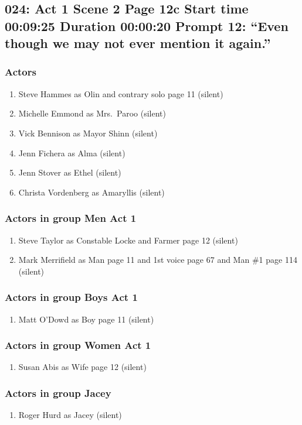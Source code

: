 \subsection{024: Act 1 Scene 2 Page 12c Start time 00:09:25 Duration 00:00:20 Prompt 12: ``Even though we may not ever mention it again.''}

\subsubsection{Actors}
\begin{enumerate}
\item Steve Hammes as Olin and contrary solo page 11 (silent)
\item Michelle Emmond as Mrs.~Paroo (silent)
\item Vick Bennison as Mayor Shinn (silent)
\item Jenn Fichera as Alma (silent)
\item Jenn Stover as Ethel (silent)
\item Christa Vordenberg as Amaryllis (silent)
\end{enumerate}
\subsubsection{Actors in group Men Act 1}
\begin{enumerate}
\item Steve Taylor as Constable Locke and Farmer page 12 (silent)
\item Mark Merrifield as Man page 11 and 1st voice page 67 and Man \#1 page 114 (silent)
\end{enumerate}
\subsubsection{Actors in group Boys Act 1}
\begin{enumerate}
\item Matt O'Dowd as Boy page 11 (silent)
\end{enumerate}
\subsubsection{Actors in group Women Act 1}
\begin{enumerate}
\item Susan Abis as Wife page 12 (silent)
\end{enumerate}
\subsubsection{Actors in group Jacey}
\begin{enumerate}
\item Roger Hurd as Jacey (silent)
\end{enumerate}


